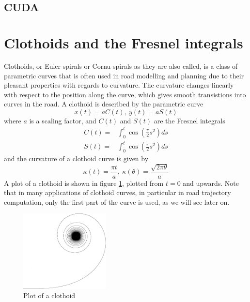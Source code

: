 \subsection{CUDA}

\section{Clothoids and the Fresnel integrals}
Clothoids, or Euler spirals or Cornu spirals as they are also called, is a class of parametric curves that is often used in road modelling and planning due to their pleasant properties with regards to curvature. The curvature changes linearly with respect to the position along the curve, which gives smooth transistions into curves in the road. A clothoid is described by the parametric curve
\begin{equation}
x(t) = aC(t),\  y(t) = aS(t) 
\label{eq:clothoid}
\end{equation}
where $a$ is a scaling factor, and $C(t)$ and $S(t)$ are the Fresnel integrals
\begin{align}
C(t) =& \int_0^t \cos\left(\frac{\pi}{2}s^2\right) ds \label{eq:fresnel_c}\\
S(t) =& \int_0^t \cos\left(\frac{\pi}{2}s^2\right) ds \label{eq:fresnel_s}
\end{align}
and the curvature of a clothoid curve is given by 
\begin{equation}
\kappa(t) = \frac{\pi t}{a},\ \kappa(\theta) = \frac{\sqrt{2\pi\theta}}{a}
\label{eq:clothoid_curvature}
\end{equation}
A plot of a clothoid is shown in figure \ref{fig:back_clothoid}, plotted from $t=0$ and upwards. Note that in many applications of clothoid curves, in particular in road trajectory computation, only the first part of the curve is used, as we will see later on.

\begin{figure}[ht]
\centering
\includegraphics[width=0.4\textwidth]{figure/cornu}
\caption{Plot of a clothoid}
\label{fig:back_clothoid}
\end{figure}

